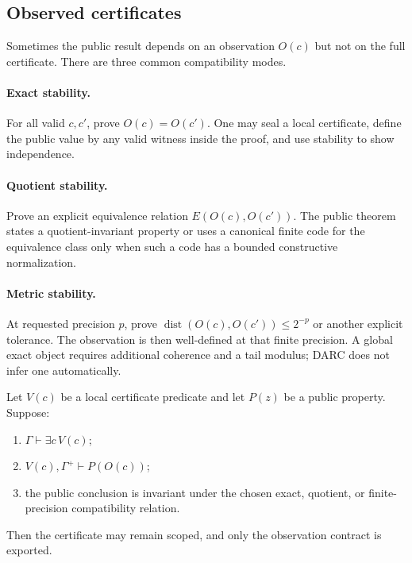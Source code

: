 \subsection{Observed certificates}

Sometimes the public result depends on an observation \(O(c)\) but not on the
full certificate.  There are three common compatibility modes.

\paragraph{Exact stability.}
For all valid \(c,c'\), prove \(O(c)=O(c')\).  One may seal a local
certificate, define the public value by any valid witness inside the proof,
and use stability to show independence.

\paragraph{Quotient stability.}
Prove an explicit equivalence relation \(E(O(c),O(c'))\).  The public theorem
states a quotient-invariant property or uses a canonical finite code for the
equivalence class only when such a code has a bounded constructive
normalization.

\paragraph{Metric stability.}
At requested precision \(p\), prove
\(\operatorname{dist}(O(c),O(c'))\le 2^{-p}\) or another explicit tolerance.
The observation is then well-defined at that finite precision.  A global exact
object requires additional coherence and a tail modulus; DARC does not infer
one automatically.

\begin{theorem}
\label{thm:observer-elimination}
Let \(V(c)\) be a local certificate predicate and let \(P(z)\) be a public
property.  Suppose:
\begin{enumerate}
  \item \(\Gamma\vdash\exists c\,V(c)\);
  \item \(V(c),\Gamma^+\vdash P(O(c))\);
  \item the public conclusion is invariant under the chosen exact, quotient,
        or finite-precision compatibility relation.
\end{enumerate}
Then the certificate may remain scoped, and only the observation contract is
exported.
\end{theorem}

